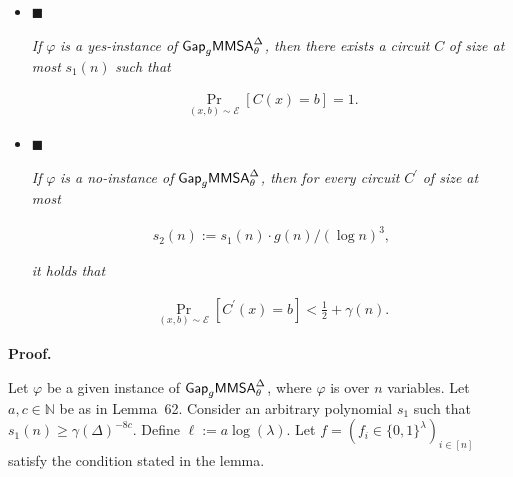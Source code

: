 \begin{itemize}


\item[] 
$\blacksquare$ 


\emph{If }$\varphi$\emph{ is a yes-instance of }${\sf Gap}_{g}{\mathsf{MMSA}}^{\Delta}_{\theta}$\emph{, then there exists a circuit }$C$\emph{ of size at most }$s_{1}(n)$\emph{ such that}\par


\[\begin{gathered}
\Pr_{(x,b)\sim\mathcal{E}}[C(x)=b]=1.
\end{gathered}\]





\item[] 
$\blacksquare$ 


\emph{If }$\varphi$\emph{ is a no-instance of }${\sf Gap}_{g}{\mathsf{MMSA}}^{\Delta}_{\theta}$\emph{, then for every circuit }$C^{\prime}$\emph{ of size at most}\par


\[\begin{gathered}
s_{2}(n):=s_{1}(n)\cdot g(n)/(\log n)^{3},
\end{gathered}\]


\emph{it holds that}\par


\[\begin{gathered}
\Pr_{(x,b)\sim\mathcal{E}}[C^{\prime}(x)=b]<\frac{1}{2}+\gamma(n).
\end{gathered}\]





\end{itemize}






\par\medskip\noindent\textbf{Proof.}\par




Let $\varphi$ be a given instance of ${\sf Gap}_{g}{\mathsf{MMSA}}^{\Delta}_{\theta}$, where $\varphi$ is over $n$ variables. Let $a,c\in\mathbb{N}$ be as in Lemma 62. Consider an arbitrary polynomial $s_{1}$ such that $s_{1}(n)\geq\gamma(\Delta)^{-8c}$. Define $\ell:=a\log(\lambda)$. Let $f=(f_{i}\in\{0,1\}^{\lambda})_{i\in[n]}$ satisfy the condition stated in the lemma.\par





